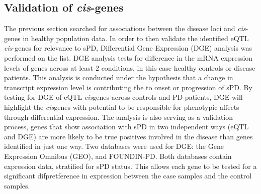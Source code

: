 \documentclass{article}
\begin{document}
\subsection{Validation of \textit{cis}-genes}
\label{subsec:validation}
The previous section searched for associations between the disease loci and \textit{cis}-genes in healthy population data. In order to then validate the identified eQTL \textit{cis}-genes for relevance to sPD, Differential Gene Expression (DGE) analysis  was performed on the list. DGE analysis tests for difference in the mRNA expression levels of genes across at least 2 conditions, in this case healthy controls or disease patients. This analysis is conducted under the hypothesis that a change in transcript expression level is contributing the to onset or progression of sPD. By testing for DGE of eQTL-\textit{cis}genes across controls and PD patients, DGE will highlight the \textit{cis}genes with potential to be responsible for phenotypic affects through differential expression. The analysis is also serving as a validation process, genes that show association with sPD in two independent ways (eQTL and DGE) are more likely to be true positives involved in the disease than genes identified in just one way.  Two databases were used for DGE: the Gene Expression Omnibus (GEO), and FOUNDIN-PD. Both databases contain expression data, stratified for sPD status. This allows each gene to be tested for a significant difpretference in expression between the case samples and the control samples.
\newpage
\end{document}
